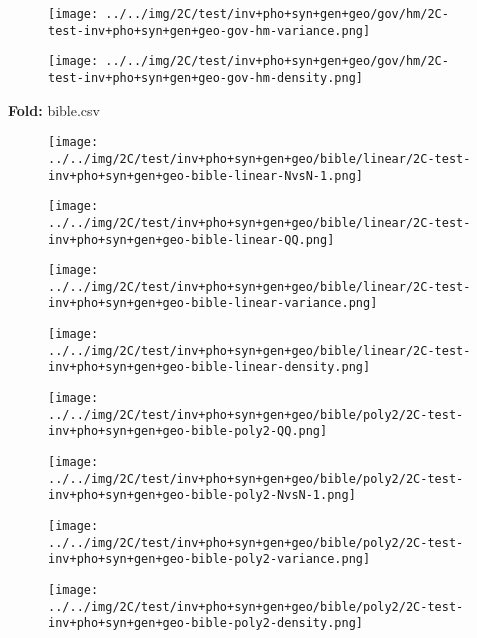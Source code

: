 \begin{figure}[H]
\centering	\texttt{[image: ../../img/2C/test/inv+pho+syn+gen+geo/gov/hm/2C-test-inv+pho+syn+gen+geo-gov-hm-variance.png]}
\end{figure}
\begin{figure}[H]
\centering	\texttt{[image: ../../img/2C/test/inv+pho+syn+gen+geo/gov/hm/2C-test-inv+pho+syn+gen+geo-gov-hm-density.png]}
\end{figure}
\textbf{Fold:} bible.csv
\begin{figure}[H]
\centering	\texttt{[image: ../../img/2C/test/inv+pho+syn+gen+geo/bible/linear/2C-test-inv+pho+syn+gen+geo-bible-linear-NvsN-1.png]}
\end{figure}
\begin{figure}[H]
\centering	\texttt{[image: ../../img/2C/test/inv+pho+syn+gen+geo/bible/linear/2C-test-inv+pho+syn+gen+geo-bible-linear-QQ.png]}
\end{figure}
\begin{figure}[H]
\centering	\texttt{[image: ../../img/2C/test/inv+pho+syn+gen+geo/bible/linear/2C-test-inv+pho+syn+gen+geo-bible-linear-variance.png]}
\end{figure}
\begin{figure}[H]
\centering	\texttt{[image: ../../img/2C/test/inv+pho+syn+gen+geo/bible/linear/2C-test-inv+pho+syn+gen+geo-bible-linear-density.png]}
\end{figure}
\begin{figure}[H]
\centering	\texttt{[image: ../../img/2C/test/inv+pho+syn+gen+geo/bible/poly2/2C-test-inv+pho+syn+gen+geo-bible-poly2-QQ.png]}
\end{figure}
\begin{figure}[H]
\centering	\texttt{[image: ../../img/2C/test/inv+pho+syn+gen+geo/bible/poly2/2C-test-inv+pho+syn+gen+geo-bible-poly2-NvsN-1.png]}
\end{figure}
\begin{figure}[H]
\centering	\texttt{[image: ../../img/2C/test/inv+pho+syn+gen+geo/bible/poly2/2C-test-inv+pho+syn+gen+geo-bible-poly2-variance.png]}
\end{figure}
\begin{figure}[H]
\centering	\texttt{[image: ../../img/2C/test/inv+pho+syn+gen+geo/bible/poly2/2C-test-inv+pho+syn+gen+geo-bible-poly2-density.png]}
\end{figure}
